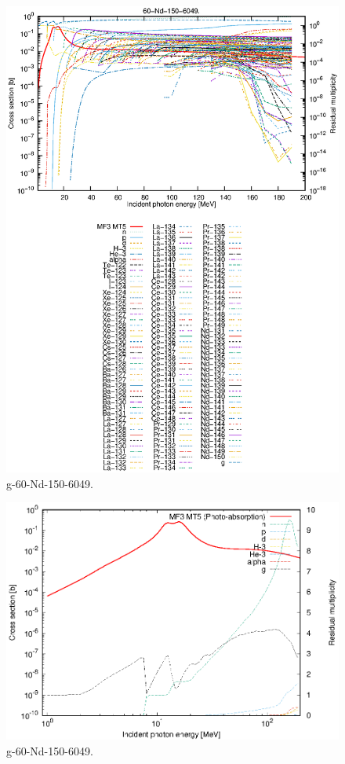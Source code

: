 \begin{figure}
 \includegraphics[width=\linewidth]{eps/g_60-Nd-150_6049.eps}
  \caption{g-60-Nd-150-6049.}
\end{figure}
\newpage \clearpage

\begin{figure}
 \includegraphics[width=\linewidth]{eps-log/g_60-Nd-150_6049.eps}
 \caption{g-60-Nd-150-6049.}
\end{figure}
\newpage \clearpage

